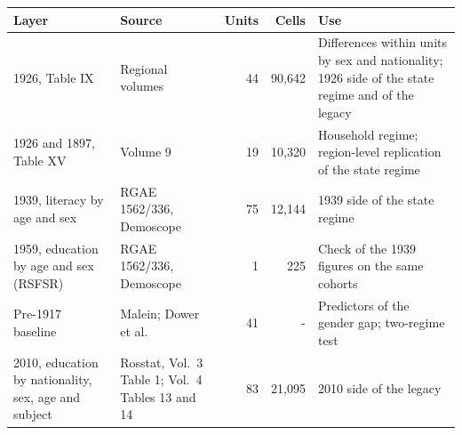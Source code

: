 \begin{tabular}{p{3.5cm}p{3.7cm}rrp{4.7cm}}
\toprule
Layer & Source & Units & Cells & Use \\
\midrule
1926, Table IX & Regional volumes & 44 & 90,642 & Differences within units by sex and nationality; 1926 side of the state regime and of the legacy \\
1926 and 1897, Table XV & Volume 9 & 19 & 10,320 & Household regime; region-level replication of the state regime \\
1939, literacy by age and sex & RGAE 1562/336, Demoscope & 75 & 12,144 & 1939 side of the state regime \\
1959, education by age and sex (RSFSR) & RGAE 1562/336, Demoscope & 1 & 225 & Check of the 1939 figures on the same cohorts \\
Pre-1917 baseline & Malein; Dower et al. & 41 & - & Predictors of the gender gap; two-regime test \\
2010, education by nationality, sex, age and subject & Rosstat, Vol.\ 3 Table 1; Vol.\ 4 Tables 13 and 14 & 83 & 21,095 & 2010 side of the legacy \\
\bottomrule
\end{tabular}
